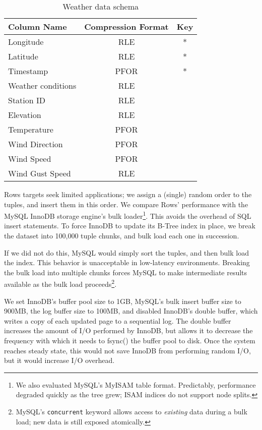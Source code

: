 \documentclass{sig-alternate-sigmod08}
\newcommand{\rows}{Rows\xspace}
\newcommand{\rowss}{Rows'\xspace}
\begin{document}
\begin{table}
\caption{Weather data schema}
\centering
\label{tab:schema}
\begin{tabular}{|l|c|c|} \hline
Column Name     & Compression Format &  Key \\ \hline
Longitude       & RLE       & *       \\ \hline
Latitude        & RLE       & *       \\\hline
Timestamp       & PFOR       & *       \\\hline
Weather conditions& RLE       &        \\\hline
Station ID        & RLE       &        \\\hline
Elevation        & RLE       &        \\\hline
Temperature      & PFOR       &        \\\hline
Wind Direction        & PFOR       &        \\\hline
Wind Speed        & PFOR       &        \\\hline
Wind Gust Speed   & RLE       &        \\
\hline\end{tabular}
\end{table}
\rows targets seek limited applications; we assign a (single) random
order to the tuples, and insert them in this order.  We compare \rowss
performance with the MySQL InnoDB storage engine's bulk
loader\footnote{We also evaluated MySQL's MyISAM table format.
  Predictably, performance degraded quickly as the tree grew; ISAM indices do not
  support node splits.}.  This avoids the overhead of SQL insert
statements.  To force InnoDB to update its B-Tree index in place, we
break the dataset into 100,000 tuple chunks, and bulk load each one in
succession.

If we did not do this, MySQL would simply sort the tuples, and then
bulk load the index.  This behavior is unacceptable in low-latency
environments.  Breaking the bulk load into multiple chunks
forces MySQL to make intermediate results available as the bulk load
proceeds\footnote{MySQL's {\tt concurrent} keyword allows access to
  {\em existing} data during a bulk load; new data is still exposed
  atomically.}.

We set InnoDB's buffer pool size to 1GB, MySQL's bulk insert buffer
size to 900MB, the log buffer size to 100MB, and disabled InnoDB's
double buffer, which writes a copy of each updated page
to a sequential log.  The double buffer increases the amount of I/O
performed by InnoDB, but allows it to decrease the frequency with
which it needs to fsync() the buffer pool to disk.  Once the system
reaches steady state, this would not save InnoDB from performing
random I/O, but it would increase I/O overhead.
\end{document}
